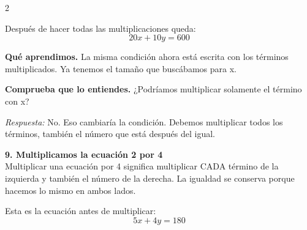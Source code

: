 \documentclass[11pt,a4paper,landscape]{article}
\begin{document}
\begin{multicols*}{2}
\begin{minipage}{\linewidth}
\par{}\par\smallskip
\par\smallskip Después de hacer todas las multiplicaciones queda:
\[20x + 10y = 600\]
\par\smallskip\textbf{Qué aprendimos.} La misma condición ahora está escrita con los términos multiplicados. Ya tenemos el tamaño que buscábamos para x.
\par\smallskip\textbf{Comprueba que lo entiendes.} ¿Podríamos multiplicar solamente el término con x?\par\textit{Respuesta:} No. Eso cambiaría la condición. Debemos multiplicar todos los términos, también el número que está después del igual.
\end{minipage}\par\medskip
\noindent\begin{minipage}{\linewidth}\textbf{9. Multiplicamos la ecuación 2 por 4}\\[2pt]Multiplicar una ecuación por 4 significa multiplicar CADA término de la izquierda y también el número de la derecha. La igualdad se conserva porque hacemos lo mismo en ambos lados.
\par\smallskip Esta es la ecuación antes de multiplicar:
\[5x + 4y = 180\]
\par{}\par\smallskip

\end{minipage}
\end{multicols*}
\end{document}
